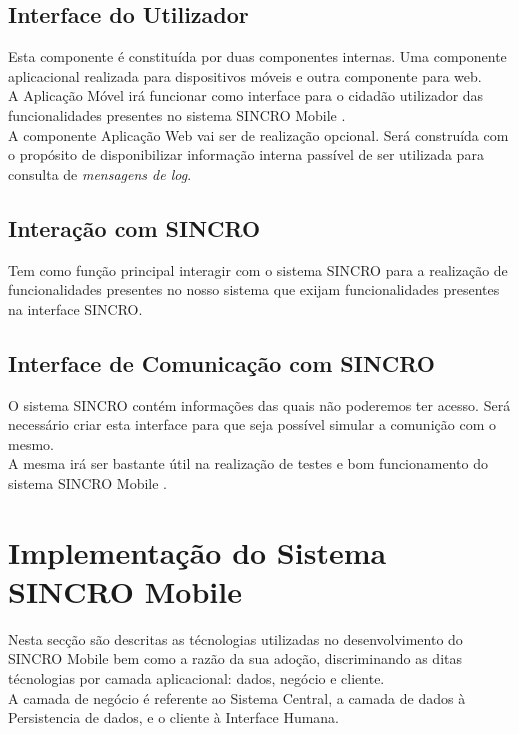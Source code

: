 \documentclass{article}
\begin{document}
\hypertarget{_interface_do_utilizador}{%
\subsection{Interface do Utilizador}\label{_interface_do_utilizador}}

Esta componente é constituída por duas componentes internas. Uma
componente aplicacional realizada para dispositivos móveis e outra
componente para web.\\
A Aplicação Móvel irá funcionar como interface para o cidadão utilizador
das funcionalidades presentes no sistema SINCRO Mobile .\\
A componente Aplicação Web vai ser de realização opcional. Será
construída com o propósito de disponibilizar informação interna passível
de ser utilizada para consulta de \emph{mensagens de log}.

\hypertarget{_intera_o_com_sincro}{%
\subsection{Interação com SINCRO}\label{_intera_o_com_sincro}}

Tem como função principal interagir com o sistema SINCRO para a
realização de funcionalidades presentes no nosso sistema que exijam
funcionalidades presentes na interface SINCRO.

\hypertarget{_interface_de_comunica_o_com_sincro}{%
\subsection{Interface de Comunicação com
SINCRO}\label{_interface_de_comunica_o_com_sincro}}

O sistema SINCRO contém informações das quais não poderemos ter acesso.
Será necessário criar esta interface para que seja possível simular a
comunição com o mesmo.\\
A mesma irá ser bastante útil na realização de testes e bom
funcionamento do sistema SINCRO Mobile .

\hypertarget{_implementa_o_do_sistema_sincro_mobile}{%
\section{Implementação do Sistema SINCRO
Mobile}\label{_implementa_o_do_sistema_sincro_mobile}}

Nesta secção são descritas as técnologias utilizadas no desenvolvimento
do SINCRO Mobile bem como a razão da sua adoção, discriminando as ditas
técnologias por camada aplicacional: dados, negócio e cliente.\\
A camada de negócio é referente ao Sistema Central, a camada de dados à
Persistencia de dados, e o cliente à Interface Humana.
\end{document}
